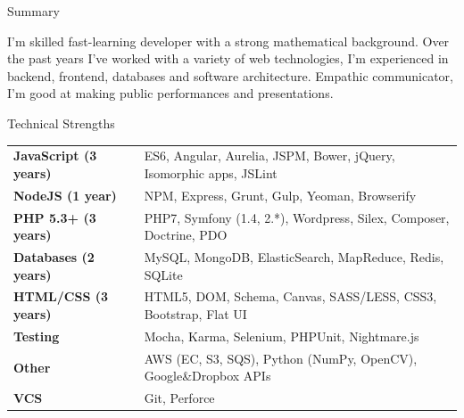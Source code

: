 \documentclass{resume} %
\begin{document}

\begin{rSection}{Summary}

I'm skilled fast-learning developer with a strong mathematical background.
Over the past years I've worked with a variety of web technologies, I'm experienced in backend, frontend, databases and software architecture.
Empathic communicator, I'm good at making public performances and presentations.

\end{rSection}



\begin{rSection}{Technical Strengths}

\begin{tabular}{ @{} >{\bfseries}l @{\hspace{4ex}} l }
JavaScript (3 years) & ES6, Angular, Aurelia, JSPM, Bower, jQuery, Isomorphic apps, JSLint \\
NodeJS (1 year) & NPM, Express, Grunt, Gulp, Yeoman, Browserify \\
PHP 5.3+ (3 years) & PHP7, Symfony (1.4, 2.*), Wordpress, Silex, Composer, Doctrine, PDO \\
Databases (2 years) & MySQL, MongoDB, ElasticSearch, MapReduce, Redis, SQLite \\
HTML/CSS (3 years) & HTML5, DOM, Schema, Canvas, SASS/LESS, CSS3, Bootstrap, Flat UI \\
Testing & Mocha, Karma, Selenium, PHPUnit, Nightmare.js \\
Other & AWS (EC, S3, SQS), Python (NumPy, OpenCV), Google\&Dropbox APIs \\
VCS & Git, Perforce \\
\end{tabular}

\end{rSection}

\end{document}
